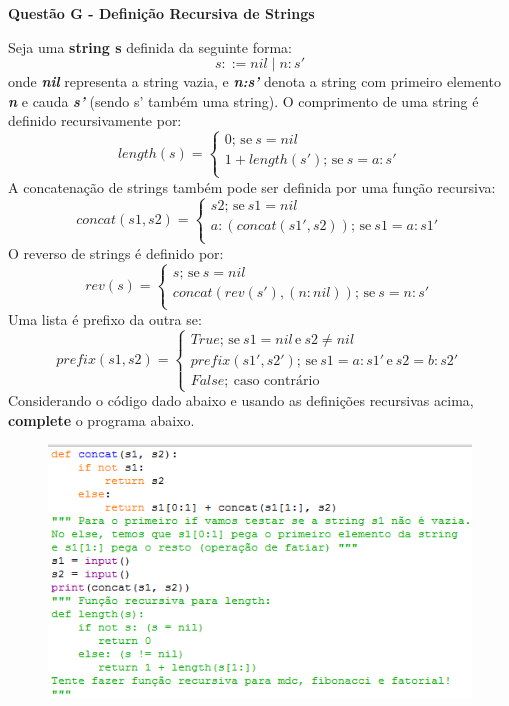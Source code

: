 \documentclass[a4paper, 12pt]{article}
\begin{document}
\newpage %
\begin{center}
\textbf{{\Large Questão G - Definição Recursiva de Strings}}
\end{center}
\vspace{5pt}
Seja uma \textbf{string s} definida da seguinte forma: $$s::= nil \mid n:s' $$onde \textbf{\textit{nil}} representa a string vazia, e \textbf{\textit{n:s'}} denota a string com primeiro elemento \textbf{\textit{n}} e cauda \textbf{\textit{s'}} (sendo s' também uma string). \newline 
O comprimento de uma string é definido recursivamente por:
$$length(s) =
		\begin{cases}
			0;\, \textrm{se}\ s = nil \\
			1 + length(s');\, \textrm{se}\ s = a:s' \\
		\end{cases}
$$
A concatenação de strings também pode ser definida por uma função recursiva:
$$concat(s1,s2) =
		\begin{cases}
			s2;\, \textrm{se}\ s1 = nil \\
			a:(concat(s1',s2));\, \textrm{se}\ s1 = a:s1' \\
		\end{cases}
$$
O reverso de strings é definido por:
$$rev(s) =
		\begin{cases}
			s;\, \textrm{se}\ s = nil \\
			concat(rev(s'), (n:nil));\, \textrm{se}\ s = n:s' \\
		\end{cases}
$$
Uma lista é prefixo da outra se:
$$prefix(s1,s2) =
		\begin{cases}
			True;\, \textrm{se}\ s1 = nil\, \textrm{e}\  s2 \neq nil\\
			prefix(s1', s2');\, \textrm{se}\ s1 = a:s1'\, \textrm{e}\ s2 = b:s2' \\
			False;\ \textrm{caso contrário}
		\end{cases}
$$
Considerando o código dado abaixo e usando as definições recursivas acima, \textbf{complete} o programa abaixo.
\begin{figure}[H]
	\centering
	\includegraphics[scale=0.75]{strings.png}
\end{figure}
\end{document}

